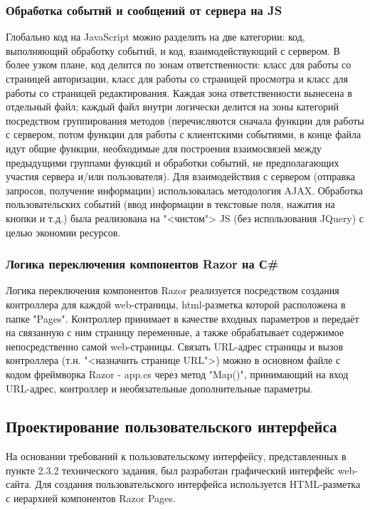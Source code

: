\subsubsection{Обработка событий и сообщений от сервера на JS}
Глобально код на JavaScript  можно разделить на две категории: код, выполняющий обработку событий, и код, взаимодействующий с сервером. В более узком плане, код делится по зонам ответственности: класс для работы со страницей авторизации, класс для работы со страницей просмотра и класс для работы со страницей редактирования. Каждая зона ответственности вынесена в отдельный файл; каждый файл внутри логически делится на зоны категорий посредством группирования методов (перечисляются сначала функции для работы с сервером, потом функции для работы с клиентскими событиями, в конце файла идут общие функции, необходимые для построения взаимосвязей между предыдущими группами функций и обработки событий, не предполагающих участия сервера и/или пользователя). Для взаимодействия с сервером (отправка запросов, получение информации) использовалась методология AJAX. Обработка пользовательских событий (ввод информации в текстовые поля, нажатия на кнопки и т.д.) была реализована на "<чистом"> JS (без использования JQuery) с целью экономии ресурсов.
  
\subsubsection{Логика переключения компонентов Razor на С\#}
Логика переключения компонентов Razor реализуется посредством создания контроллера для каждой web-страницы, html-разметка которой расположена в папке "Pages". Контроллер принимает в качестве входных параметров и передаёт на связанную с ним страницу переменные, а также обрабатывает содержимое непосредственно самой web-страницы. Связать URL-адрес страницы и вызов контроллера (т.н. "<назначить странице URL">) можно в основном файле с кодом фреймворка Razor - app.cs через метод "Map()", принимающий на вход URL-адрес, контроллер и необязательные дополнительные параметры.

\subsection{Проектирование пользовательского интерфейса}
На основании требований к пользовательскому интерфейсу, представленных в пункте 2.3.2 технического задания, был разработан графический интерфейс web-сайта. Для создания пользовательского интерфейса используется HTML-разметка с иерархией компонентов Razor Pages.

